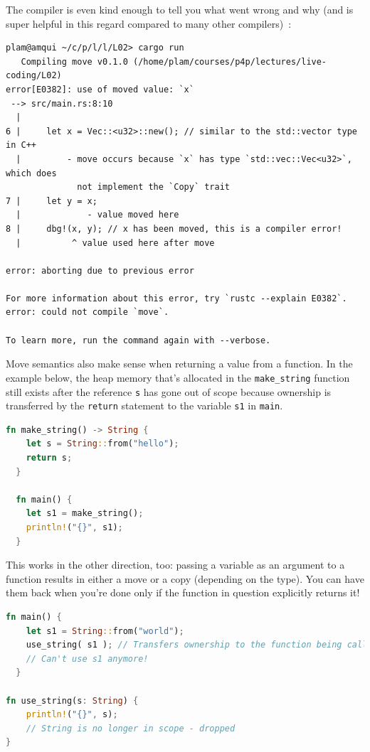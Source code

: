 \documentclass[a4paper]{report}
\begin{document}
The compiler is even kind enough to tell you what went wrong and why (and is super helpful in this regard compared to many other compilers)~\cite{rustdocs}:
\begin{verbatim}
plam@amqui ~/c/p/l/l/L02> cargo run
   Compiling move v0.1.0 (/home/plam/courses/p4p/lectures/live-coding/L02)
error[E0382]: use of moved value: `x`
 --> src/main.rs:8:10
  |
6 |     let x = Vec::<u32>::new(); // similar to the std::vector type in C++
  |         - move occurs because `x` has type `std::vec::Vec<u32>`, which does 
              not implement the `Copy` trait
7 |     let y = x;
  |             - value moved here
8 |     dbg!(x, y); // x has been moved, this is a compiler error!
  |          ^ value used here after move

error: aborting due to previous error

For more information about this error, try `rustc --explain E0382`.
error: could not compile `move`.

To learn more, run the command again with --verbose.
\end{verbatim}

Move semantics also make sense when returning a value from a function. In the example below, the heap memory that's allocated in the \texttt{make\_string} function still exists after the reference \texttt{s} has gone out of scope because ownership is transferred by the \texttt{return} statement to the variable \texttt{s1} in \texttt{main}.

\begin{lstlisting}[language=Rust]
  fn make_string() -> String {
    let s = String::from("hello");
    return s;
  }

  fn main() {
    let s1 = make_string();
    println!("{}", s1);
  }
\end{lstlisting}

This works in the other direction, too: passing a variable as an argument to a function results in either a move or a copy (depending on the type). You can have them back when you're done only if the function in question explicitly returns it! 

\begin{lstlisting}[language=Rust]
  fn main() {
    let s1 = String::from("world");
	use_string( s1 ); // Transfers ownership to the function being called
	// Can't use s1 anymore!
  }
  
fn use_string(s: String) {
    println!("{}", s); 
    // String is no longer in scope - dropped
}
\end{lstlisting}
\end{document}
